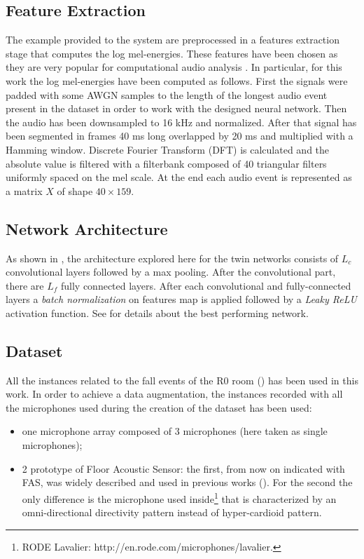 \subsection{Feature Extraction}
The example provided to the system are preprocessed in a features extraction stage that computes the log mel-energies. These features have been chosen as they are very popular for computational audio analysis \cite{gemmeke2013exemplar,parascandolo2017convolutional,mesaros2010acoustic}.
In particular, for this work the log mel-energies have been computed as follows.
First the signals were padded with some AWGN samples to the length of the longest audio event present in the dataset in order to work with the designed neural network.
Then the audio has been downsampled to 16 kHz and normalized. After that signal has been segmented in frames 40 ms long overlapped
by 20 ms and multiplied with a Hamming window. Discrete Fourier Transform (DFT) is calculated and the absolute value is filtered with a filterbank composed of 40 triangular filters uniformly spaced on the mel scale. At the end each audio event is represented as a matrix $X$ of shape $40\times159$.  

\subsection{Network Architecture}
As shown in , the architecture explored here for the twin networks consists of $L_c$ convolutional layers followed by a max pooling. After the convolutional part, there are $L_f$ fully connected layers. After each convolutional and fully-connected layers a \textsl{batch normalization} on features map is applied followed by a \textsl{Leaky ReLU} activation function.
See  for details about the best performing network. 



\subsection{Dataset}
All the instances related to the fall events of the R0 room () has been used in this work. In order to achieve a data augmentation, the instances recorded with all the microphones used during the creation of the dataset has been used:
\begin{itemize}
	\item one microphone array composed of 3 microphones (here taken as single microphones);
	\item 2 prototype of Floor Acoustic Sensor: the first, from now on indicated with FAS, was widely described and used in previous works \cite{Principi2016a} (). For the second the only difference is the microphone used inside\footnote{RODE Lavalier: http://en.rode.com/microphones/lavalier.} that is characterized by an omni-directional directivity pattern instead of hyper-cardioid pattern.
\end{itemize}

